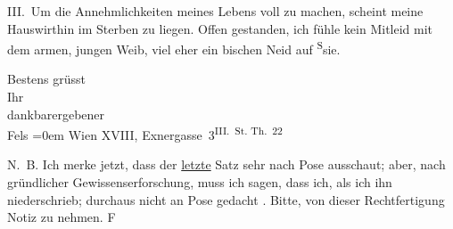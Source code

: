 \pstart
           III. Um die Annehmlichkeiten meines Lebens voll zu machen, scheint meine Hauswirthin im Sterben zu
               liegen. Offen gestanden, ich fühle kein Mitleid mit dem armen, jungen Weib, viel eher
               ein bischen Neid auf \substVorne{}\textsuperscript{S}\substDazwischen{}s\substHinten{}ie.\pend
           
\pstart
           Bestens grüsst{\\[\baselineskip]}Ihr{\\[\baselineskip]}dankbarergebener{\\[\baselineskip]}\spacefill\mbox{Fels}\pend
           \leftskip=0em{}
\pstart
           \noindent{}Wien XVIII, Exnergasse 3\textsuperscript{III. St. Th. 22}\pend
           
\pstart
           N. B. Ich merke jetzt, dass der \uline{letzte} Satz sehr
                  nach Pose ausschaut; aber, nach gründlicher Gewissenserforschung, muss ich sagen,
                  dass ich, als ich ihn niederschrieb; durchaus nicht an Pose gedacht \label{T_L00326-1v}\label{T_L00326-1}. Bitte, von dieser
                  Rechtfertigung Notiz zu nehmen. \spacefill\mbox{F}\pend
           \endnumbering{}  
      